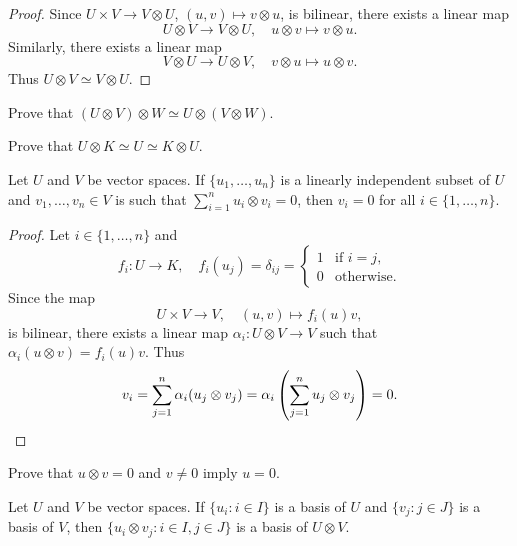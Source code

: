 \begin{proof}
	Since $U\times V\to V\otimes U$, $(u,v)\mapsto v\otimes u$, is bilinear, there exists 
	a linear map 
    \[
    U\otimes V\to V\otimes U,\quad u\otimes
	v\mapsto v\otimes u.
    \]
    Similarly, there exists a linear map 
	\[
    V\otimes U\to U\otimes V,\quad  v\otimes u\mapsto
	u\otimes v.
    \]
    Thus $U\otimes V\simeq V\otimes U$.
\end{proof}

\begin{exercise}
	\label{xca:UxVxW}
    Prove that $(U\otimes V)\otimes W\simeq U\otimes(V\otimes W)$.
\end{exercise}

\begin{exercise}
	\label{xca:UxK}
	Prove that $U\otimes K\simeq U\simeq K\otimes U$.
\end{exercise}

\begin{proposition}
	\label{pro:U_LI}
	Let $U$ and $V$ be vector spaces. 
	If $\{u_1,\dots,u_n\}$ is a linearly independent subset of $U$ and 
	$v_1,\dots,v_n\in V$ is such that $\sum_{i=1}^n u_i\otimes v_i=0$, then 
    $v_i=0$ for all $i\in\{1,\dots,n\}$.
\end{proposition}

\begin{proof}
	Let $i\in\{1,\dots,n\}$ and 
	\[
	f_i\colon U\to K,
	\quad
	f_i(u_j)=\delta_{ij}=\begin{cases}
	1 & \text{if $i=j$},\\
	0 & \text{otherwise}.
	\end{cases}
	\]
	Since the map 
 \[
 U\times V\to V,\quad (u,v)\mapsto f_i(u)v,
 \]
 is bilinear, there exists 
	a linear map 
	$\alpha_i\colon U\otimes V\to V$ such that $\alpha_i(u\otimes
	v)=f_i(u)v$. Thus
	\[
		v_i=\sum_{j=1}^n\alpha_i(u_j\otimes v_j)=\alpha_i\left(\sum_{j=1}^nu_j\otimes v_j\right)=0.\qedhere
	\]
\end{proof}

\begin{exercise}
	\label{xca:uxv=0}
	Prove that $u\otimes v=0$ and $v\ne 0$ imply $u=0$.
\end{exercise}

\begin{theorem}
    Let $U$ and $V$ be vector spaces. 
	If $\{u_i:i\in I\}$ is a basis of $U$ and $\{v_j:j\in J\}$ is a basis of $V$, then 
	$\{u_i\otimes v_j:i\in I,j\in J\}$ is a basis of $U\otimes
	V$.
\end{theorem}

